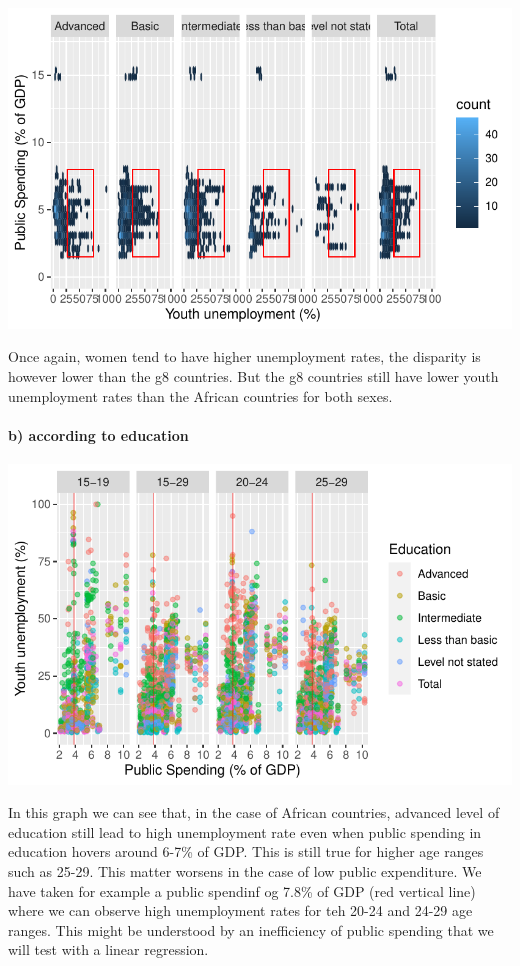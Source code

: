\documentclass[
  letterpaper,
  DIV=11,
  numbers=noendperiod]{scrartcl}
\let\oldparagraph\paragraph
\renewcommand{\paragraph}[1]{\oldparagraph{#1}\mbox{}}
\begin{document}
\includegraphics{Projet-BM_files/figure-pdf/unnamed-chunk-31-2.pdf}

Once again, women tend to have higher unemployment rates, the disparity
is however lower than the g8 countries. But the g8 countries still have
lower youth unemployment rates than the African countries for both
sexes.

\hypertarget{b-according-to-education}{%
\paragraph{b) according to education}\label{b-according-to-education}}

\includegraphics{Projet-BM_files/figure-pdf/unnamed-chunk-32-1.pdf}

In this graph we can see that, in the case of African countries,
advanced level of education still lead to high unemployment rate even
when public spending in education hovers around 6-7\% of GDP. This is
still true for higher age ranges such as 25-29. This matter worsens in
the case of low public expenditure. We have taken for example a public
spendinf og 7.8\% of GDP (red vertical line) where we can observe high
unemployment rates for teh 20-24 and 24-29 age ranges. This might be
understood by an inefficiency of public spending that we will test with
a linear regression.
\end{document}
